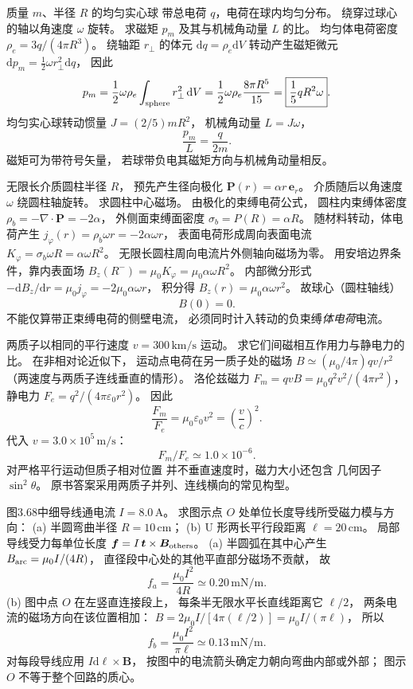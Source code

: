 质量 $m$、半径 $R$ 的均匀实心球
带总电荷 $q$，电荷在球内均匀分布。
绕穿过球心的轴以角速度 $\omega$ 旋转。
求磁矩 $p_m$ 及其与机械角动量 $L$ 的比。
\exsolution
均匀体电荷密度
$\rho_e=3q/(4\pi R^3)$。
绕轴距 $r_\perp$ 的体元
$\mathrm dq=\rho_e\mathrm dV$
转动产生磁矩微元
$\mathrm dp_m=\frac12\omega r_\perp^2\mathrm dq$，
因此
\[
p_m=\frac12\omega\rho_e
\int_{\rm sphere}r_\perp^2\,\mathrm dV
=\frac12\omega\rho_e\frac{8\pi R^5}{15}
=\boxed{\frac15 qR^2\omega}.
\]
均匀实心球转动惯量
$J=(2/5)mR^2$，
机械角动量 $L=J\omega$，
\[
\boxed{\frac{p_m}{L}=\frac{q}{2m}}.
\]
\excheck 磁矩可为带符号矢量，
若球带负电其磁矩方向与机械角动量相反。

无限长介质圆柱半径 $R$，
预先产生径向极化
$\bm P(r)=\alpha r\,\bm e_r$。
介质随后以角速度 $\omega$
绕圆柱轴旋转。
求圆柱中心磁场。
\exsolution
由极化的束缚电荷公式，
圆柱内束缚体密度
$\rho_b=-\nabla\cdot\bm P=-2\alpha$，
外侧面束缚面密度
$\sigma_b=P(R)=\alpha R$。
随材料转动，体电荷产生
$j_\varphi(r)=\rho_b\omega r=-2\alpha\omega r$，
表面电荷形成周向表面电流
$K_\varphi=\sigma_b\omega R=\alpha\omega R^2$。
无限长圆柱周向电流片外侧轴向磁场为零。
用安培边界条件，靠内表面场
$B_z(R^-)=\mu_0K_\varphi
=\mu_0\alpha\omega R^2$。
内部微分形式
$-\mathrm dB_z/\mathrm dr
=\mu_0j_\varphi=-2\mu_0\alpha\omega r$，
积分得
$B_z(r)=\mu_0\alpha\omega r^2$。
故球心（圆柱轴线）
\[
\boxed{B(0)=0}.
\]
\excheck 不能仅算带正束缚电荷的侧壁电流，
必须同时计入转动的负束缚\emph{体电荷}电流。

两质子以相同的平行速度
$v=300\,\mathrm{km/s}$ 运动。
求它们间磁相互作用力与静电力的比。
\exsolution
在非相对论近似下，
运动点电荷在另一质子处的磁场
$B\simeq(\mu_0/4\pi)qv/r^2$
（两速度与两质子连线垂直的情形）。
洛伦兹磁力
$F_m=qvB=\mu_0q^2v^2/(4\pi r^2)$，
静电力
$F_e=q^2/(4\pi\varepsilon_0r^2)$。
因此
\[
\boxed{\frac{F_m}{F_e}=
\mu_0\varepsilon_0v^2
=\left(\frac vc\right)^2}.
\]
代入 $v=3.0\times10^5\,\mathrm{m/s}$：
\[
\boxed{F_m/F_e\simeq1.0\times10^{-6}}.
\]
\excheck 对严格平行运动但质子相对位置
并不垂直速度时，磁力大小还包含
几何因子 $\sin^2\theta$。
原书答案采用两质子并列、连线横向的常见构型。

图3.68中细导线通电流 $I=8.0\,\mathrm A$。
求图示点 $O$ 处单位长度导线所受磁力模与方向：
(a) 半圆弯曲半径 $R=10\,\mathrm{cm}$；
(b) U 形两长平行段距离 $\ell=20\,\mathrm{cm}$。
\exsolution
局部导线受力每单位长度
$\bm f=I\,\bm t\times\bm B_{\rm others}$。
(a) 半圆弧在其中心产生
$B_{\rm arc}=\mu_0I/(4R)$，
直径段中心处的其他平直部分磁场不贡献，
故
\[
\boxed{f_a=\frac{\mu_0I^2}{4R}
\simeq0.20\,\mathrm{mN/m}}.
\]
(b) 图中点 $O$ 在左竖直连接段上，
每条半无限水平长直线距离它 $\ell/2$，
两条电流的磁场方向在该位置相加：
$B=2\mu_0I/[4\pi(\ell/2)]
=\mu_0I/(\pi\ell)$，
所以
\[
\boxed{f_b=\frac{\mu_0I^2}{\pi\ell}
\simeq0.13\,\mathrm{mN/m}}.
\]
\excheck 对每段导线应用
$I\mathrm d\bm\ell\times\bm B$，
按图中的电流箭头确定力朝向弯曲内部或外部；
图示 $O$ 不等于整个回路的质心。

